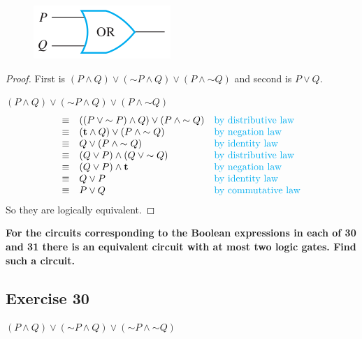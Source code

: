 \documentclass[14pt]{extarticle}
\newcommand{\true}{{\bf t}}
\begin{document}
\begin{figure}[ht!] 
\centering
\includegraphics[scale=0.5]{../images/2.4.29.b.png} 
\end{figure}

\begin{proof} 
First is $(P \wedge Q) \vee ({\sim P} \wedge Q) \vee (P \wedge {\sim Q})$ and second is $P \vee Q$.

$(P \wedge Q) \vee ({\sim P} \wedge Q) \vee (P \wedge {\sim Q})$ $$
\begin{array}{cll} 
\equiv & ((P \vee {\sim P}) \wedge Q) \vee (P \wedge {\sim
Q}) & \text{\color{cyan}by distributive law} \\ 
\equiv & (\true \wedge Q) \vee (P \wedge {\sim Q}) & \text{\color{cyan}by negation law} \\ \equiv & Q \vee (P
\wedge {\sim Q}) & \text{\color{cyan}by identity law} \\ 
\equiv & (Q \vee P) \wedge (Q \vee {\sim Q}) & \text{\color{cyan} by distributive law} \\
\equiv & (Q \vee P) \wedge \true & \text{\color{cyan}by negation law} \\ 
\equiv & Q \vee P & \text{\color{cyan}by identity law} \\ 
\equiv & P \vee Q & \text{\color{cyan}by commutative law} \\ 
\end{array} 
$$ 
So they are logically equivalent. 
\end{proof}

{\bf \color{cyan} For the circuits corresponding to the Boolean expressions in each of 30 and 31 there is an equivalent circuit with at most two logic gates. Find such a circuit.}

\subsection{Exercise 30} 
$(P \wedge Q) \vee ({\sim P} \wedge Q) \vee ({\sim P} \wedge {\sim Q})$
\end{document}
